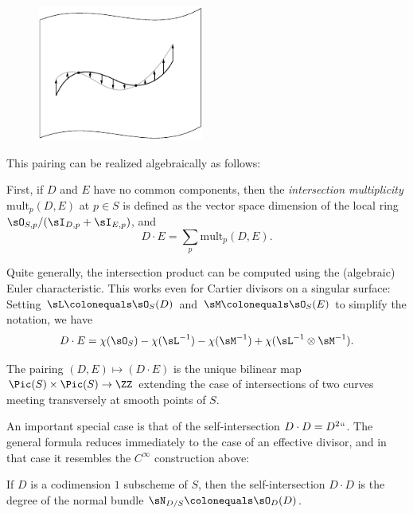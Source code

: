 \begin{figure}   %
\Small
\centerline{\includegraphics[height=1.75in]{"main/Fig02-strip"}%
%
%
}
\label{vanishing of normal vector field}
\end{figure}

This pairing can be realized algebraically as follows:

First, if $D$ and $E$ have no common
%
components, then the \emph{intersection multiplicity} 
$\mathrm{mult}_{p}(D,E)$ at $p\in S$
%
is defined as the vector space dimension of the local ring $\sO_{S,p}/(\sI_{D,p}+\sI_{E,p})$, and 
$$
D\cdot E = \sum_p \mathrm{mult}_{p}(D,E).
$$

Quite generally, 
the intersection product can be computed using the (algebraic) Euler
characteristic. 
This
works even for 
Cartier divisors
on a singular surface: Setting $\sL \colonequals \sO_S(D)$ and
%
%
$\sM \colonequals \sO_S(E)$ to simplify the notation, we have 
$$
D\cdot E = \chi(\sO_S)-\chi(\sL^{-1}) -\chi(\sM^{-1}) +\chi(\sL^{-1}\otimes \sM^{-1}) 
.
$$

\begin{theorem} The pairing $(D,E) \mapsto (D\cdot E)$ is the unique bilinear map
$\Pic(S) \times \Pic(S) \to \ZZ$ extending the case of intersections of two curves meeting transversely at smooth points of $S$. 
\unif
\end{theorem}

An important special case is that of the self-intersection $D\cdot D = D^2` `$. The general formula reduces immediately to the case of an effective divisor, and in that case it resembles the $C^{\infty}$ construction above:

\begin{corollary}\label{self-intersection number}
If $D$ is a codimension $1$ subscheme of $S$, then the self-intersection $D\cdot D$ is the degree of the normal bundle
$\sN_{D/S} \colonequals \sO_{D}(D)$.
\unif
\end{corollary}

